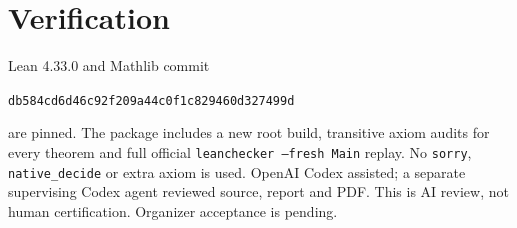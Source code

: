\documentclass[11pt]{article}
\begin{document}
\section{Verification}
Lean 4.33.0 and Mathlib commit
\begin{center}\small\texttt{db584cd6d46c92f209a44c0f1c829460d327499d}\end{center}
are pinned. The package includes a new root build, transitive axiom
audits for every theorem and full official
\texttt{leanchecker --fresh Main} replay. No \texttt{sorry},
\texttt{native\_decide} or extra axiom is used. OpenAI Codex assisted;
a separate supervising Codex agent reviewed source, report and PDF.
This is AI review, not human certification. Organizer acceptance is pending.
\end{document}
